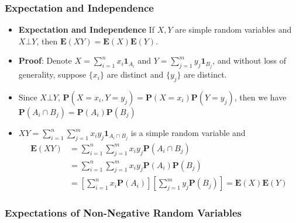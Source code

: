 \documentclass[handout]{beamer}
\newcommand{\BP}{\mathbf{P}}
\newcommand{\BE}{\mathbf{E}}
\newcommand{\BI}{\mathbf{1}}
\begin{document}
\frame
{
  \frametitle{Expectation and Independence}

   \begin{itemize}


\item<1-> \textbf{Expectation and Independence} If $X, Y$ are simple random variables and $X\bot Y$, then $\BE(XY)=\BE(X)\BE(Y)$.                         
\item<2-> \textbf{Proof}: Denote $X=\sum_{i=1}^n x_i \BI_{A_i}$ and $Y=\sum_{j=1}^m y_j \BI_{B_j}$, and without loss of generality, suppose $\{x_i\}$ are distinct and $\{y_j\}$ are distinct. 
                                                  
\item<3->[-] Since $X\bot Y$, $\BP(X=x_i, Y=y_j)=\BP(X=x_i)\BP(Y=y_j)$, then we have $\BP(A_i\cap B_j)=\BP(A_i)\BP(B_j)$
                                                                                                    
\item<4->[-] $XY=\sum_{i=1}^n \sum_{j=1}^m  x_iy_j \BI_{A_i \cap B_j}$ is a simple random variable and   
\begin{align*}
\BE(XY)&=\sum_{i=1}^n \sum_{j=1}^m  x_iy_j \BP(A_i \cap B_j) \\ 
&= \sum_{i=1}^n \sum_{j=1}^m  x_iy_j \BP(A_i)\BP(B_j) \\ 
&= \left[\sum_{i=1}^n  x_i \BP(A_i )\right] \left[ \sum_{j=1}^m  y_j \BP(B_j) \right]=\BE(X)\BE(Y)
\end{align*}
                                                                                                                           
\end{itemize}
}

\subsubsection{Expectations of Non-Negative Random Variables}
\end{document}
